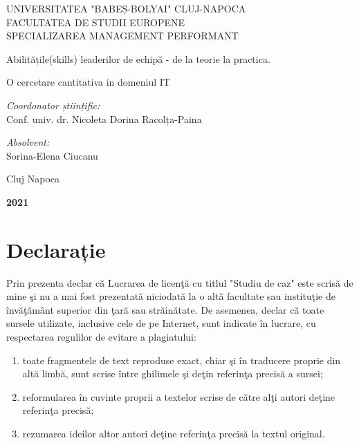 \documentclass[a4paper, 12pt]{article}
\begin{document}
\begin{titlepage}
	\begin{center}
		\vspace{0.5cm}
		\large {UNIVERSITATEA "BABEȘ-BOLYAI" CLUJ-NAPOCA}
		\\
		\large {FACULTATEA DE STUDII EUROPENE}
		\\\large {SPECIALIZAREA MANAGEMENT PERFORMANT}
		
		\vspace{2.75cm}
		
	
		\huge Abilitățile(skills) leaderilor de echipă - de la teorie la practica. 
		
		\huge O cercetare cantitativa  in domeniul IT
		\vspace{1.5 cm}
		
		\vfill
	\end{center}
	
	\begin{flushleft}
		\large{\textit{Coordonator științific:}} \\
		\large{Conf. univ. dr. Nicoleta Dorina Racolța-Paina}
	\end{flushleft}
	
	\begin{flushright}
		\hfill \large {\textit{Absolvent:}} \\
		\hfill \large {Sorina-Elena Ciucanu}
	\end{flushright}
	
	\begin{center}
		\vspace{1.5cm}
		\Large{Cluj Napoca}
		
		\large \textbf{2021}
	\end{center}
\end{titlepage}
\restoregeometry
\thispagestyle{empty}
\section*{Declarație}
\bigskip
\qquad Prin prezenta declar că Lucrarea de licenţă cu titlul "Studiu de caz" este scrisă de mine şi nu a mai fost prezentată niciodată la o altă facultate sau instituţie de învăţământ superior din ţară sau străinătate. De asemenea, declar că toate sursele utilizate, inclusive cele de pe Internet, sunt indicate în lucrare, cu respectarea regulilor de evitare a plagiatului:
\begin{enumerate}[-]
	\item toate fragmentele de text reproduse exact, chiar şi în traducere proprie din altă limbă, sunt scrise între ghilimele şi deţin referinţa precisă a sursei;
	\item reformularea în cuvinte proprii a textelor scrise de către alţi autori deţine referinţa precisă;
	\item rezumarea ideilor altor autori deţine referinţa precisă la textul original.
\end{enumerate}
\end{document}
